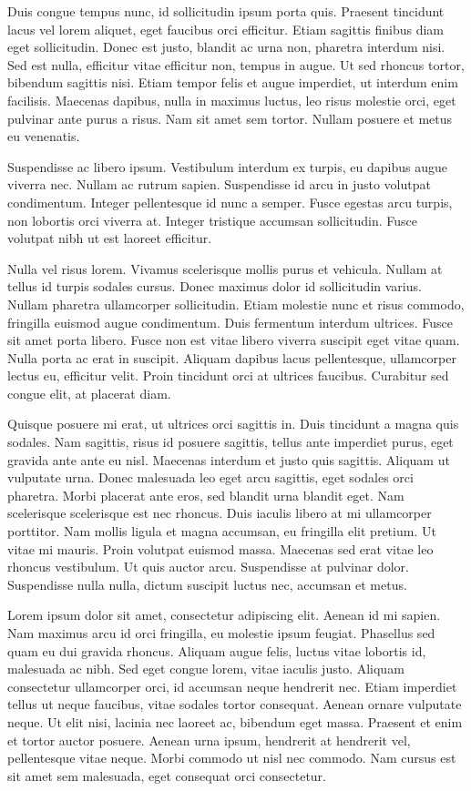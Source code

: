 \documentclass{article}
\begin{document}
Duis congue tempus nunc, id sollicitudin ipsum porta quis. Praesent tincidunt lacus vel lorem aliquet, eget faucibus orci efficitur. Etiam sagittis finibus diam eget sollicitudin. Donec est justo, blandit ac urna non, pharetra interdum nisi. Sed est nulla, efficitur vitae efficitur non, tempus in augue. Ut sed rhoncus tortor, bibendum sagittis nisi. Etiam tempor felis et augue imperdiet, ut interdum enim facilisis. Maecenas dapibus, nulla in maximus luctus, leo risus molestie orci, eget pulvinar ante purus a risus. Nam sit amet sem tortor. Nullam posuere et metus eu venenatis.

Suspendisse ac libero ipsum. Vestibulum interdum ex turpis, eu dapibus augue viverra nec. Nullam ac rutrum sapien. Suspendisse id arcu in justo volutpat condimentum. Integer pellentesque id nunc a semper. Fusce egestas arcu turpis, non lobortis orci viverra at. Integer tristique accumsan sollicitudin. Fusce volutpat nibh ut est laoreet efficitur.

Nulla vel risus lorem. Vivamus scelerisque mollis purus et vehicula. Nullam at tellus id turpis sodales cursus. Donec maximus dolor id sollicitudin varius. Nullam pharetra ullamcorper sollicitudin. Etiam molestie nunc et risus commodo, fringilla euismod augue condimentum. Duis fermentum interdum ultrices. Fusce sit amet porta libero. Fusce non est vitae libero viverra suscipit eget vitae quam. Nulla porta ac erat in suscipit. Aliquam dapibus lacus pellentesque, ullamcorper lectus eu, efficitur velit. Proin tincidunt orci at ultrices faucibus. Curabitur sed congue elit, at placerat diam.

Quisque posuere mi erat, ut ultrices orci sagittis in. Duis tincidunt a magna quis sodales. Nam sagittis, risus id posuere sagittis, tellus ante imperdiet purus, eget gravida ante ante eu nisl. Maecenas interdum et justo quis sagittis. Aliquam ut vulputate urna. Donec malesuada leo eget arcu sagittis, eget sodales orci pharetra. Morbi placerat ante eros, sed blandit urna blandit eget. Nam scelerisque scelerisque est nec rhoncus. Duis iaculis libero at mi ullamcorper porttitor. Nam mollis ligula et magna accumsan, eu fringilla elit pretium. Ut vitae mi mauris. Proin volutpat euismod massa. Maecenas sed erat vitae leo rhoncus vestibulum. Ut quis auctor arcu. Suspendisse at pulvinar dolor. Suspendisse nulla nulla, dictum suscipit luctus nec, accumsan et metus.

Lorem ipsum dolor sit amet, consectetur adipiscing elit. Aenean id mi sapien. Nam maximus arcu id orci fringilla, eu molestie ipsum feugiat. Phasellus sed quam eu dui gravida rhoncus. Aliquam augue felis, luctus vitae lobortis id, malesuada ac nibh. Sed eget congue lorem, vitae iaculis justo. Aliquam consectetur ullamcorper orci, id accumsan neque hendrerit nec. Etiam imperdiet tellus ut neque faucibus, vitae sodales tortor consequat. Aenean ornare vulputate neque. Ut elit nisi, lacinia nec laoreet ac, bibendum eget massa. Praesent et enim et tortor auctor posuere. Aenean urna ipsum, hendrerit at hendrerit vel, pellentesque vitae neque. Morbi commodo ut nisl nec commodo. Nam cursus est sit amet sem malesuada, eget consequat orci consectetur.
\end{document}

